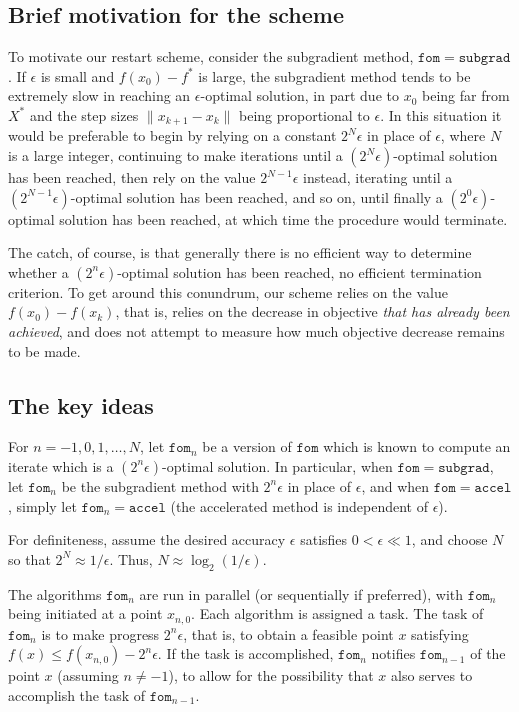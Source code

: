 \documentclass[reqno, 11pt]{amsart}
\numberwithin{equation}{section}
\newcommand{\fom}{\mathtt{fom}}
\newcommand{\subgrad}{\mathtt{subgrad}}
\newcommand{\accel}{\mathtt{accel}}
\begin{document}
\subsection{Brief motivation for the scheme}  \label{sect.ab} 

To motivate our restart scheme, consider the subgradient method, $ \fom = \subgrad $. If $ \epsilon $ is small and $ f(x_0) - f^* $ is large, the subgradient method tends to be extremely slow in reaching an $ \epsilon $-optimal solution, in part due to $ x_0 $ being far from $ X^* $ and the step sizes $ \| x_{k+1} - x_k \|  $ being proportional to $ \epsilon $.  In this situation it would be preferable to begin by relying on a constant $ 2^N \epsilon $  in place of $ \epsilon $, where $ N $ is a large integer, continuing to make iterations until a $ (2^N \epsilon) $-optimal solution has been reached, then rely on the value $ 2^{N-1} \epsilon   $ instead, iterating  until a $ (2^{N-1} \epsilon)  $-optimal solution has been reached, and so on, until finally a $ (2^0 \epsilon) $-optimal solution has been reached, at which time the procedure would terminate.

The catch, of course, is that generally there is no efficient way to determine whether a $ (2^n \epsilon) $-optimal solution has been reached, no efficient termination criterion. To get around this conundrum, our scheme relies on the value $ f(x_0) - f(x_k) $, that is, relies on the  decrease in objective {\em  that has already been achieved}, and does not attempt to measure how much objective decrease remains to be made. 

\subsection{The key ideas}  \label{sect.ac}

For $ n = -1, 0, 1, \ldots, N $, let $ \fom_n $ be a version of $ \fom $ which is known to compute an iterate which is a $ (2^n \epsilon) $-optimal solution. In particular, when $ \fom = \subgrad $, let $ \fom_n $ be the subgradient method with $ 2^n \epsilon $ in place of $ \epsilon $, and when $ \fom = \accel $, simply let $ \fom_n = \accel $ (the accelerated method is independent of $ \epsilon $).

For definiteness, assume the desired accuracy $ \epsilon $ satisfies $ 0 < \epsilon \ll 1 $, and choose $ N $ so that $ 2^N \approx 1/\epsilon $. Thus, $ N \approx \log_2(1/\epsilon) $.

The algorithms $ \fom_n $ are run in parallel (or sequentially if preferred), with $ \fom_n $ being initiated at a point $ x_{n,0} $. Each algorithm is assigned a task. The task of $ \fom_n $ is to make progress $ 2^n \epsilon $, that is, to obtain a feasible point $ x $  satisfying $ f(x) \leq f(x_{n,0}) -  2^n \epsilon $. If the task is accomplished, $ \fom_n $ notifies $ \fom_{n-1} $ of the point $ x $ (assuming $ n \neq -1 $), to allow for the possibility that $ x $ also serves to accomplish the task of $ \fom_{n-1} $. 
\end{document}

